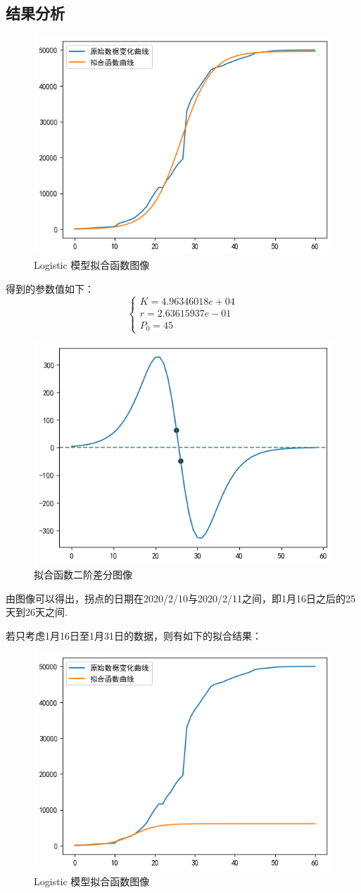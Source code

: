 \documentclass[UTF8,ctexart,a4paper,11pt,openany]{article}
\theoremstyle{definition}
\begin{document}
    \subsection{结果分析}
    \begin{figure}[H]
        \centering
        \includegraphics[width=0.6\linewidth]{pics/P7.8.png}
        \caption{Logistic 模型拟合函数图像}
    \end{figure}
    得到的参数值如下：$$\left\{\begin{array}{l}
        K=4.96346018e+04 \\
        r=2.63615937e-01 \\
        P_0=45
        \end{array}\right.$$
    \begin{figure}[H]
        \centering
        \includegraphics[width=0.6\linewidth]{pics/P7.9.png}
        \caption{拟合函数二阶差分图像}
    \end{figure}
    由图像可以得出，拐点的日期在2020/2/10与2020/2/11之间，即1月16日之后的25天到26天之间. \par 若只考虑1月16日至1月31日的数据，则有如下的拟合结果：
    \begin{figure}[H]
        \centering
        \includegraphics[width=0.6\linewidth]{pics/P7.10.png}
        \caption{Logistic 模型拟合函数图像}
    \end{figure}
\end{document}
